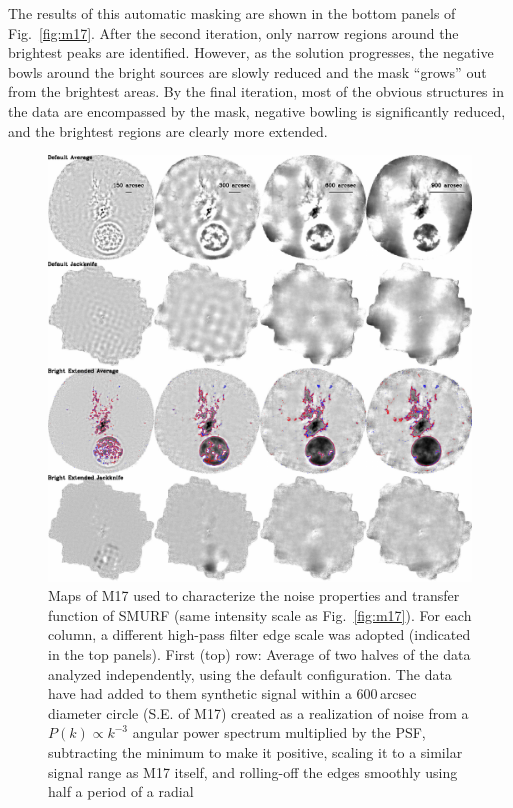 \documentclass[useAMS,usenatbib,nofootinbib]{mn2e}
\begin{document}
The results of this automatic masking are shown in the bottom panels
of Fig.~\ref{fig:m17}. After the second iteration, only narrow regions
around the brightest peaks are identified. However, as the solution
progresses, the negative bowls around the bright sources are slowly
reduced and the mask ``grows'' out from the brightest areas. By the
final iteration, most of the obvious structures in the data are
encompassed by the mask, negative bowling is significantly reduced,
and the brightest regions are clearly more extended.


\begin{figure}
\centering
\includegraphics[width=\linewidth]{m17_jk.pdf}
\caption{Maps of M17 used to characterize the noise properties and
transfer function of SMURF (same intensity scale as
Fig.~\ref{fig:m17}). For each column, a different high-pass filter
edge scale was adopted (indicated in the top panels). First (top) row:
Average of two halves of the data analyzed independently, using the
default configuration. The data have had added to them synthetic
signal within a 600\,arcsec diameter circle (S.E. of M17) created as a
realization of noise from a $P(k) \propto k^{-3}$ angular power
spectrum multiplied by the PSF, subtracting the minimum to make it
positive, scaling it to a similar signal range as M17 itself, and
rolling-off the edges smoothly using half a period of a radial
}
\end{figure}
\end{document}
